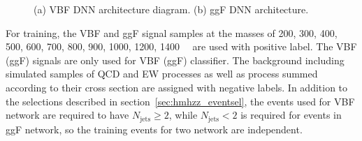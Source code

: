 \begin{figure}[htbp]
        \centering
        \caption{(a) VBF DNN architecture diagram. (b) ggF DNN architecture.}
        \label{fig:dnn_arch}
\end{figure}

For training, the VBF and ggF signal samples at the masses of 200, 300, 400, 500, 600, 700, 800, 900, 1000, 1200, 1400~\gev~ are used with positive label.
The VBF (ggF) signals are only used for VBF (ggF) classifier.
The background including simulated samples of QCD and EW \qqZZ processes as well as \ggZZ process summed according to their cross section are assigned with negative labels.
In addition to the selections described in section~\ref{sec:hmhzz_eventsel}, the events used for VBF network are required to have $N_\mathrm{jets} \geq 2$, while $N_\mathrm{jets} < 2$ is required for events in ggF network,
so the training events for two network are independent.

